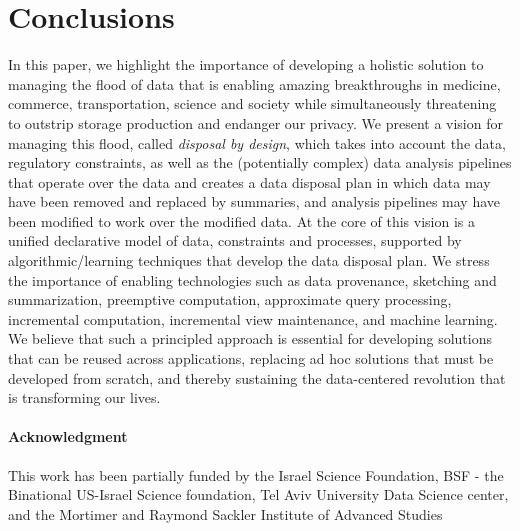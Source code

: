 \documentclass[11pt,dvipdfm]{article}
\begin{document}
\section{Conclusions}
\label{sec: concl}
In this paper, we highlight the importance of developing a holistic solution to managing the flood of data that is enabling amazing breakthroughs in medicine, commerce, transportation, science and society while simultaneously threatening to outstrip storage production and endanger our privacy.
We present a vision for managing this flood, called \textit{disposal by design}, which takes into account the data, regulatory constraints, as well as the (potentially complex) data analysis pipelines that operate over the data and creates a data disposal plan in which data may have been removed and replaced by summaries, and analysis pipelines may have been modified to work over the modified data.  At the core of this vision is a unified declarative model of data, constraints and processes, supported by algorithmic/learning techniques that develop the data disposal plan.  We stress the importance of enabling technologies such as data provenance, sketching and summarization, preemptive computation, approximate query processing, incremental computation, incremental view maintenance, and machine learning.
We believe that such a principled approach is essential for
developing solutions that can be reused across applications, replacing ad hoc solutions that must be developed from scratch, and thereby sustaining the data-centered revolution that is transforming our lives.

\paragraph*{Acknowledgment} {This work has been partially funded by the Israel Science Foundation, BSF - the Binational US-Israel Science foundation, Tel Aviv University Data Science center, and the Mortimer and Raymond Sackler Institute of Advanced Studies
}
\end{document}
